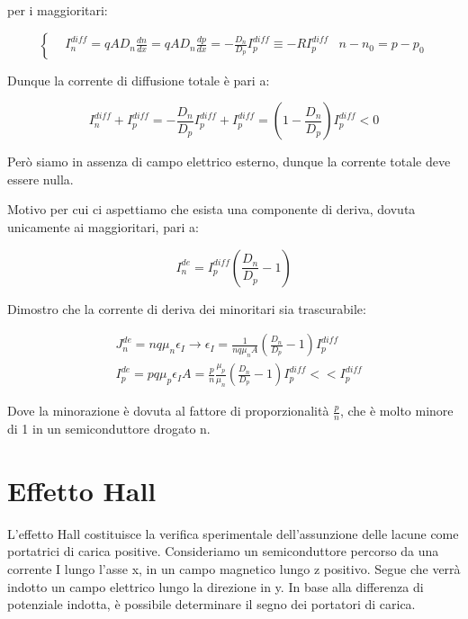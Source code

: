 \documentclass{article}
\begin{document}
per i maggioritari:

\begin{equation}
    \left\{
    \begin{aligned}
         & I^{diff}_n= qAD_n \frac{dn}{dx}=qAD_n\frac{dp}{dx}=-\frac{D_n}{D_p}I^{diff}_p \equiv -RI^{diff}_p
         & n-n_0=p-p_0
    \end{aligned}
    \right.
\end{equation}

Dunque la corrente di diffusione totale è pari a:

\begin{equation}
    I^{diff}_n+I^{diff}_p=-\frac{D_n}{D_p}I^{diff}_p+I^{diff}_p= (1-\frac{D_n}{D_p})I^{diff}_p<0
\end{equation}

Però siamo in assenza di campo elettrico esterno, dunque la corrente totale deve essere nulla.

Motivo per cui ci aspettiamo che esista una componente di deriva, dovuta unicamente ai maggioritari, pari a:

\begin{equation}
    I^{de}_n=I^{diff}_p\left(\frac{D_n}{D_p}-1\right)
\end{equation}

Dimostro che la corrente di deriva dei minoritari sia trascurabile:

\begin{equation}
    \begin{aligned}
         & J^{de}_n=nq\mu_n\epsilon_I \rightarrow \epsilon_I=\frac{1}{nq\mu_nA}\left(\frac{D_n}{D_p}-1\right)I^{diff}_p     \\
         & I^{de}_p=pq\mu_p\epsilon_IA=\frac{p}{n}\frac{\mu_p}{\mu_n}\left(\frac{D_n}{D_p}-1\right)I^{diff}_p << I^{diff}_p
    \end{aligned}
\end{equation}

Dove la minorazione è dovuta al fattore di proporzionalità $\frac{p}{n}$, che è molto minore di 1 in un semiconduttore drogato n.

\section{Effetto Hall}

L'effetto Hall costituisce la verifica sperimentale dell'assunzione delle lacune come portatrici di carica positive.
Consideriamo un semiconduttore percorso da una corrente I lungo l'asse x, in un campo magnetico lungo z positivo.
Segue che verrà indotto un campo elettrico lungo la direzione in y.
In base alla differenza di potenziale indotta, è possibile determinare il segno dei portatori di carica.
\end{document}
